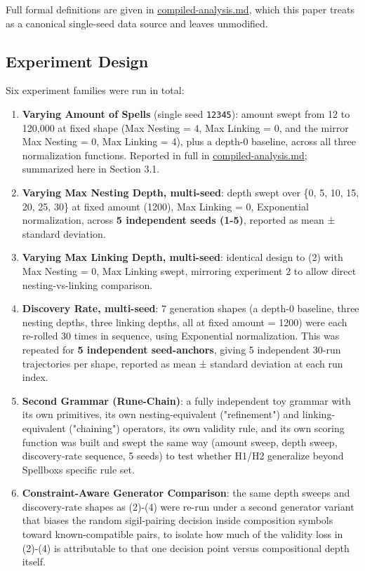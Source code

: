 \documentclass[
  10pt,
  twocolumn]{article}
\providecommand{\tightlist}{%
  \setlength{\itemsep}{0pt}\setlength{\parskip}{0pt}}
\begin{document}
Full formal definitions are given in \url{compiled-analysis.md}, which
this paper treats as a canonical single-seed data source and leaves
unmodified.

\subsection{Experiment Design}\label{experiment-design}

Six experiment families were run in total:

\begin{enumerate}
\def\labelenumi{\arabic{enumi}.}
\tightlist
\item
  \textbf{Varying Amount of Spells} (single seed \texttt{12345}): amount
  swept from 12 to 120,000 at fixed shape (Max Nesting = 4, Max Linking
  = 0, and the mirror Max Nesting = 0, Max Linking = 4), plus a depth-0
  baseline, across all three normalization functions. Reported in full
  in \url{compiled-analysis.md}; summarized here in Section 3.1.
\item
  \textbf{Varying Max Nesting Depth, multi-seed}: depth swept over \{0,
  5, 10, 15, 20, 25, 30\} at fixed amount (1200), Max Linking = 0,
  Exponential normalization, across \textbf{5 independent seeds (1-5)},
  reported as mean ± standard deviation.
\item
  \textbf{Varying Max Linking Depth, multi-seed}: identical design to
  (2) with Max Nesting = 0, Max Linking swept, mirroring experiment 2 to
  allow direct nesting-vs-linking comparison.
\item
  \textbf{Discovery Rate, multi-seed}: 7 generation shapes (a depth-0
  baseline, three nesting depths, three linking depths, all at fixed
  amount = 1200) were each re-rolled 30 times in sequence, using
  Exponential normalization. This was repeated for \textbf{5 independent
  seed-anchors}, giving 5 independent 30-run trajectories per shape,
  reported as mean ± standard deviation at each run index.
\item
  \textbf{Second Grammar (Rune-Chain)}: a fully independent toy grammar
  with its own primitives, its own nesting-equivalent ("refinement") and
  linking-equivalent ("chaining") operators, its own validity rule, and
  its own scoring function was built and swept the same way (amount
  sweep, depth sweep, discovery-rate sequence, 5 seeds) to test whether
  H1/H2 generalize beyond Spellbox\textquotesingle s specific rule set.
\item
  \textbf{Constraint-Aware Generator Comparison}: the same depth sweeps
  and discovery-rate shapes as (2)-(4) were re-run under a second
  generator variant that biases the random sigil-pairing decision inside
  composition symbols toward known-compatible pairs, to isolate how much
  of the validity loss in (2)-(4) is attributable to that one decision
  point versus compositional depth itself.
\end{enumerate}
\end{document}
